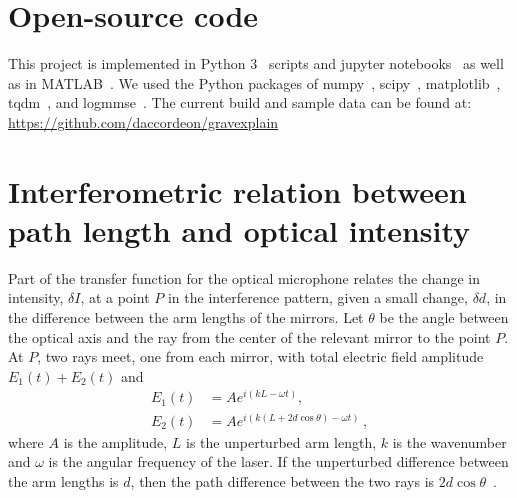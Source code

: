 \documentclass[paper-main.tex]{subfiles}
\begin{document}
\section{Open-source code}
\label{app:code}
This project is implemented in Python 3~\cite{python} scripts and jupyter notebooks~\cite{jupyter,ipython} as well as in MATLAB~\cite{MATLAB}. We used the Python packages of numpy~\cite{numpy}, scipy~\cite{scipy}, matplotlib~\cite{matplotlib}, tqdm~\cite{tqdm}, and logmmse~\cite{logmmse}.
The current build and sample data can be found at:
\url{https://github.com/daccordeon/gravexplain}



\section{Interferometric relation between path length and optical intensity}
\label{app:intensity_derivation}

Part of the transfer function for the optical microphone relates the change in intensity, $\delta I$, at a point $P$ in the interference pattern, given a small change, $\delta d$, in the difference between the arm lengths of the mirrors. 
Let $\theta$ be the angle between the optical axis and the ray from the center of the relevant mirror to the point $P$. 
At $P$, two rays meet, one from each mirror, with total electric field amplitude $E_1(t) + E_2(t)$ and 
\begin{align}
    E_1(t) &= A e^{i (k L - \omega t)},                       \label{eqn:E1} \\
    E_2(t) &= A e^{i (k (L + 2 d \cos{\theta}) - \omega t)}\,  \label{eqn:E2}, 
\end{align}
where $A$ is the amplitude, $L$ is the unperturbed arm length, $k$ is the wavenumber and $\omega$ is the angular frequency of the laser. 
If the unperturbed difference between the arm lengths is $d$, then the path difference between the two rays is $2 d \cos{\theta}$~\cite{fringes:online}.
\end{document}
